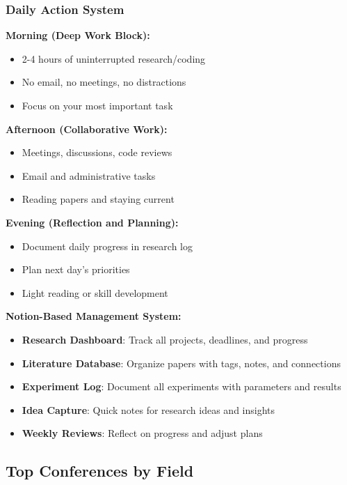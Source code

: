 \documentclass[11pt,a4paper]{article}
\begin{document}
\subsubsection{Daily Action System}

\begin{tcolorbox}[colback=green!10,colframe=green!50,title=The PhD Daily Routine]
\textbf{Morning (Deep Work Block):}
\begin{itemize}
    \item 2-4 hours of uninterrupted research/coding
    \item No email, no meetings, no distractions
    \item Focus on your most important task
\end{itemize}

\textbf{Afternoon (Collaborative Work):}
\begin{itemize}
    \item Meetings, discussions, code reviews
    \item Email and administrative tasks
    \item Reading papers and staying current
\end{itemize}

\textbf{Evening (Reflection and Planning):}
\begin{itemize}
    \item Document daily progress in research log
    \item Plan next day's priorities
    \item Light reading or skill development
\end{itemize}
\end{tcolorbox}

\textbf{Notion-Based Management System:}
\begin{itemize}
    \item \textbf{Research Dashboard}: Track all projects, deadlines, and progress
    \item \textbf{Literature Database}: Organize papers with tags, notes, and connections
    \item \textbf{Experiment Log}: Document all experiments with parameters and results
    \item \textbf{Idea Capture}: Quick notes for research ideas and insights
    \item \textbf{Weekly Reviews}: Reflect on progress and adjust plans
\end{itemize}

\subsection{Top Conferences by Field}
\end{document}
